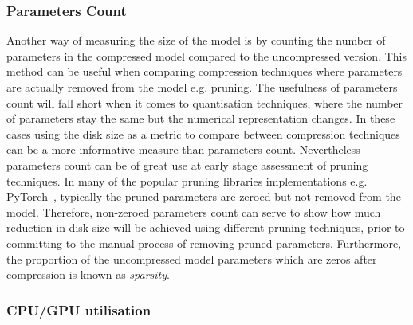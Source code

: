 \subsubsection{Parameters Count}
Another way of measuring the size of the model is by counting the number of parameters in the compressed model compared to the uncompressed version. This method can be useful when comparing compression techniques where parameters are actually removed from the model e.g. pruning. 
%
The usefulness of parameters count will fall short when it comes to quantisation techniques, where the number of parameters stay the same but the numerical representation changes.
In these cases using the disk size as a metric to compare between compression techniques can be a more informative measure than parameters count.
%
Nevertheless parameters count can be of great use at early stage assessment of pruning techniques.
%
In many of the popular pruning libraries implementations e.g. PyTorch~\cite{paszke2017automatic}, typically the pruned parameters are zeroed but not removed from the model.
%
%
Therefore, non-zeroed parameters count can serve to show how much reduction in disk size will be achieved using different pruning techniques, prior to committing to the manual process of removing pruned parameters. 
%
Furthermore, the proportion of the uncompressed model parameters which are zeros after compression is known as \textit{sparsity}.



\subsubsection{CPU/GPU utilisation}

